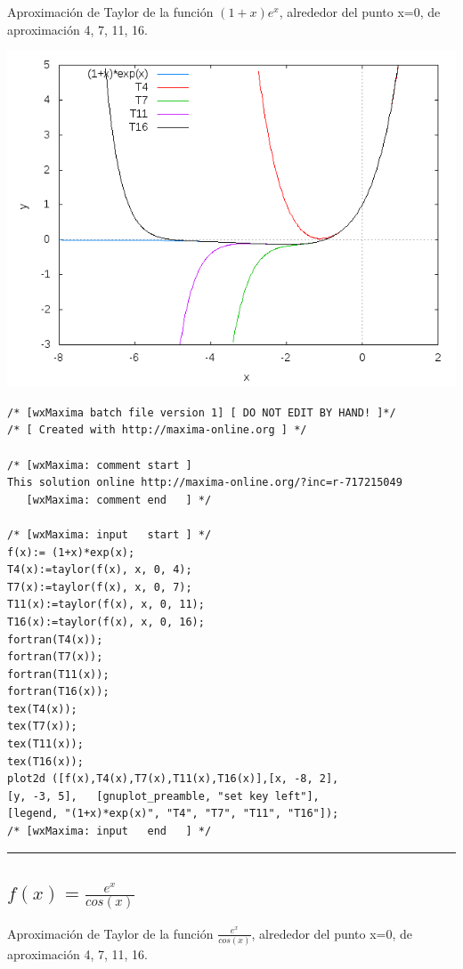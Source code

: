 \documentclass{article}
\begin{document}
Aproximaci\'on de Taylor de la funci\'on $(1+x)e^x$, alrededor del punto  x=0, de aproximaci\'on 4, 7, 11, 16.

\includegraphics[scale=.5]{xexp}

\begin{Verbatim}[frame=single]
/* [wxMaxima batch file version 1] [ DO NOT EDIT BY HAND! ]*/
/* [ Created with http://maxima-online.org ] */

/* [wxMaxima: comment start ]
This solution online http://maxima-online.org/?inc=r-717215049
   [wxMaxima: comment end   ] */

/* [wxMaxima: input   start ] */
f(x):= (1+x)*exp(x);
T4(x):=taylor(f(x), x, 0, 4);
T7(x):=taylor(f(x), x, 0, 7);
T11(x):=taylor(f(x), x, 0, 11);
T16(x):=taylor(f(x), x, 0, 16);
fortran(T4(x));
fortran(T7(x));
fortran(T11(x));
fortran(T16(x));
tex(T4(x));
tex(T7(x));
tex(T11(x));
tex(T16(x));
plot2d ([f(x),T4(x),T7(x),T11(x),T16(x)],[x, -8, 2],
[y, -3, 5],   [gnuplot_preamble, "set key left"],
[legend, "(1+x)*exp(x)", "T4", "T7", "T11", "T16"]);
/* [wxMaxima: input   end   ] */
\end{Verbatim}



\noindent\rule{\textwidth}{1pt}


\subsection{$f(x)= \frac{e^x}{cos(x)}$}

Aproximaci\'on de Taylor de la funci\'on $\frac{e^x}{cos(x)}$, alrededor del punto  x=0, de aproximaci\'on 4, 7, 11, 16.
\end{document}
